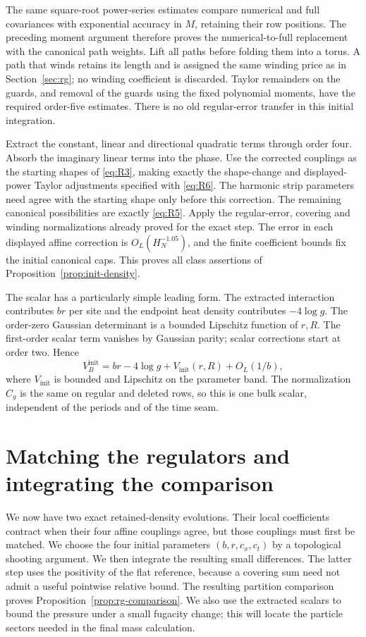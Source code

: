 The same square-root power-series estimates compare numerical and full
covariances with exponential accuracy in $M$, retaining their row
positions.  The preceding moment argument therefore proves the
numerical-to-full replacement with the canonical path weights.  Lift
all paths before folding them into a torus.  A path that winds retains
its length and is assigned the same winding price as in
Section~\ref{sec:rg}; no winding coefficient is discarded.  Taylor
remainders on the guards, and removal of the guards using the fixed
polynomial moments, have the required order-five estimates.  There is
no old regular-error transfer in this initial integration.

Extract the constant, linear and directional quadratic terms through
order four.  Absorb the imaginary linear terms into the phase.  Use
the corrected couplings as the starting shapes of \eqref{eq:R3}, making
exactly the shape-change and displayed-power Taylor adjustments specified
with \eqref{eq:R6}.  The harmonic strip parameters need agree with the
starting shape only before this correction.  The remaining canonical
possibilities are exactly \eqref{eq:R5}.  Apply the regular-error,
covering and winding normalizations already proved for the exact step.
The error in each displayed affine correction is
$O_L(H_N^{-1.05})$, and the finite coefficient bounds fix the initial
canonical caps.  This proves all class assertions of
Proposition~\ref{prop:init-density}.

The scalar has a particularly simple leading form.  The extracted
interaction contributes $br$ per site and the endpoint heat density
contributes $-4\log g$.  The order-zero Gaussian determinant is a bounded
Lipschitz function of $r,R$.  The first-order scalar term vanishes by
Gaussian parity; scalar corrections start at order two.  Hence
\begin{equation}
 V_B^{\mathrm{init}}
   =br-4\log g+V_{\mathrm{init}}(r,R)+O_L(1/b),
 \label{eq:R14}
\end{equation}
where $V_{\mathrm{init}}$ is bounded and Lipschitz on the parameter band.
The normalization $C_g$ is the same on regular and deleted rows, so this
is one bulk scalar, independent of the periods and of the time seam.

\section{Matching the regulators and integrating the comparison}
\label{sec:comparison}

We now have two exact retained-density evolutions.  Their local
coefficients contract when their four affine couplings agree, but those
couplings must first be matched.  We choose the four initial parameters
$(b,r,c_x,c_t)$ by a topological shooting argument.  We then integrate
the resulting small differences.  The latter step uses the positivity
of the flat reference, because a covering sum need not admit a useful
pointwise relative bound.
The resulting partition comparison proves
Proposition~\ref{prop:rg-comparison}.  We also use the extracted scalars
to bound the pressure under a small fugacity change; this will locate
the particle sectors needed in the final mass calculation.

